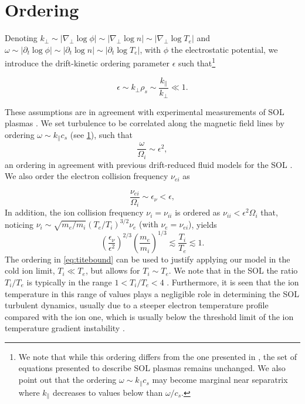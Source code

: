 \section{Ordering}
\label{sec:ordering}

Denoting {$k_\perp \sim |\nabla_\perp \log \phi|\sim |\nabla_\perp \log n|\sim |\nabla_\perp \log T_{e}|$ and $\omega \sim |\partial_t \log \phi| \sim |\partial_t \log n| \sim |\partial_t \log T_e|$}, with $\phi$ the electrostatic potential, we introduce the drift-kinetic ordering parameter $\epsilon$ such that\footnote[1]
%
{\label{note1}We note that while this ordering differs from the one presented in \citet{Jorge2017}, the set of equations presented to describe SOL plasmas remains unchanged.
%
We also point out that the ordering $\omega \sim k_\parallel c_s$ may become marginal near separatrix where $k_\parallel$ decreases to values below than $\omega/c_s$.
}

\begin{equation}
    \epsilon \sim k_\perp \rho_s \sim \frac{k_\parallel}{k_\perp} \ll 1.
    \label{eq:ordering}
\end{equation}

These assumptions are in agreement with experimental measurements of SOL plasmas \citep{LaBombard2001,Zweben2004,Myra2013,Carralero2014}.
%
We set turbulence to be correlated along the magnetic field lines by ordering $\omega \sim k_\parallel c_s$ (see \cref{note1}), such that
%
\begin{equation}
    \frac{\omega}{\Omega_i} \sim \epsilon^2,
\label{eq:ordering2}
\end{equation}
%
an ordering in agreement with previous drift-reduced fluid models for the SOL \citep{Zeiler1997,Catto2004}.
%
We also order the electron collision frequency $\nu_{ei}$ as

\begin{equation}
	\frac{\nu_{ei}}{ \Omega_i} \sim \epsilon_\nu < \epsilon,
	\label{eq:orderingnu}
\end{equation}
%
In addition, the ion collision frequency ${\nu_i =} \nu_{ii}$ is ordered as $\nu_{ii} < \epsilon^2 \Omega_i$ that, noticing $\nu_i \sim  \sqrt{{m_e}/{m_i}}(T_e/T_i)^{3/2} \nu_e$ {(with $\nu_e = \nu_{ei}$)}, yields
\begin{equation}
    \left(\frac{\epsilon_\nu}{\epsilon^2}\right)^{2/3}\left(\frac{m_e}{m_i}\right)^{1/3}\lesssim\frac{T_i}{T_e}\lesssim 1.
    \label{eq:titebound}
\end{equation}
The ordering in \cref{eq:titebound} can be used to justify applying our model in the cold ion limit, $T_i \ll T_e$, {but allows for $T_i \sim T_e$}.
We note that in the SOL the ratio $T_i/T_e$ is typically in the range $1 < T_i/T_e < 4$ \citep{Kocan2011}. Furthermore, it is seen that the ion temperature in this range of values plays a negligible role in determining the SOL turbulent dynamics, usually due to a steeper electron temperature profile compared with the ion one, which is usually below the threshold limit of the ion temperature gradient instability \citep{Mosetto2015}.

